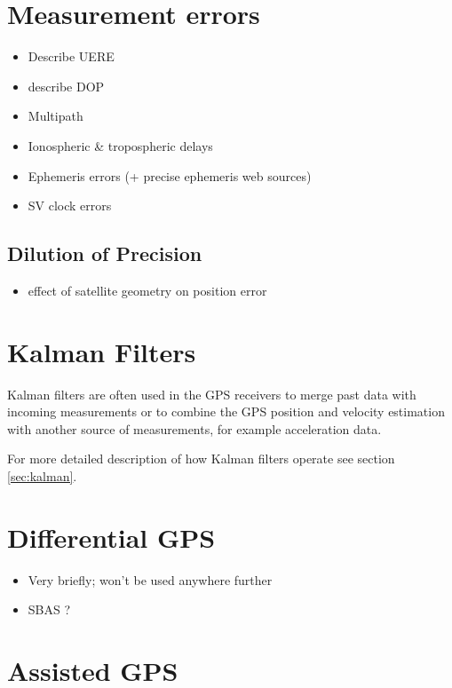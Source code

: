 \section{Measurement errors}
\begin{itemize}
\item Describe UERE
\item describe DOP
\label{sec:gps-dop}
\end{itemize}

\begin{itemize}
\item Multipath
\item Ionospheric \& tropospheric delays
\item Ephemeris errors (+ precise ephemeris web sources)
\item SV clock errors
\end{itemize}

\subsection{Dilution of Precision}
\begin{itemize}
\item effect of satellite geometry on position error
\end{itemize}

\section{Kalman Filters}
Kalman filters are often used in the GPS receivers to merge past
data with incoming measurements or to combine the GPS position and velocity
estimation with another source of measurements, for example acceleration data.

For more detailed description of how Kalman filters operate see section
\ref{sec:kalman}.

\section{Differential GPS}
\begin{itemize}
\item Very briefly; won't be used anywhere further
\item SBAS ?
\end{itemize}

\section{Assisted GPS}

